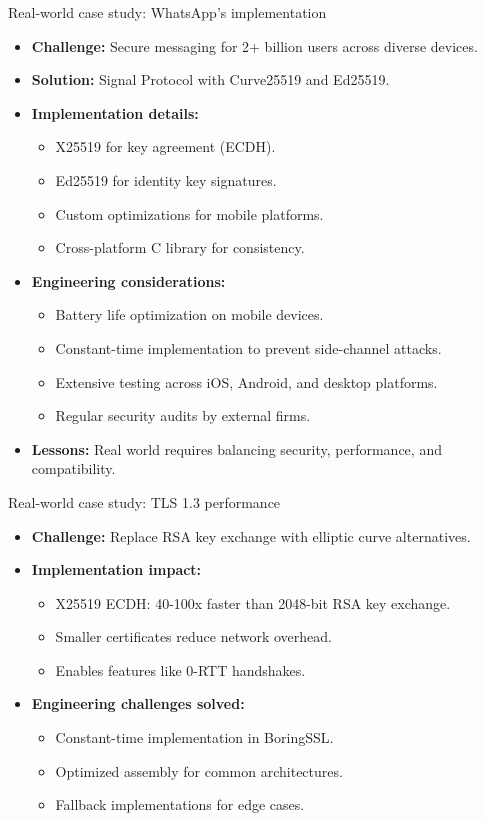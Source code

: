 \documentclass[aspectratio=169, lualatex, handout]{beamer}
\begin{document}
\begin{frame}{Real-world case study: WhatsApp's implementation}
	\begin{itemize}
		\item \textbf{Challenge:} Secure messaging for 2+ billion users across diverse devices.
		\item \textbf{Solution:} Signal Protocol with Curve25519 and Ed25519.
		\item \textbf{Implementation details:}
		      \begin{itemize}
			      \item X25519 for key agreement (ECDH).
			      \item Ed25519 for identity key signatures.
			      \item Custom optimizations for mobile platforms.
			      \item Cross-platform C library for consistency.
		      \end{itemize}
		\item \textbf{Engineering considerations:}
		      \begin{itemize}
			      \item Battery life optimization on mobile devices.
			      \item Constant-time implementation to prevent side-channel attacks.
			      \item Extensive testing across iOS, Android, and desktop platforms.
			      \item Regular security audits by external firms.
		      \end{itemize}
		\item \textbf{Lessons:} Real world requires balancing security, performance, and compatibility.
	\end{itemize}
\end{frame}

\begin{frame}{Real-world case study: TLS 1.3 performance}
	\begin{itemize}
		\item \textbf{Challenge:} Replace RSA key exchange with elliptic curve alternatives.
		\item \textbf{Implementation impact:}
		      \begin{itemize}
			      \item X25519 ECDH: 40-100x faster than 2048-bit RSA key exchange.
			      \item Smaller certificates reduce network overhead.
			      \item Enables features like 0-RTT handshakes.
		      \end{itemize}
		\item \textbf{Engineering challenges solved:}
		      \begin{itemize}
			      \item Constant-time implementation in BoringSSL.
			      \item Optimized assembly for common architectures.
			      \item Fallback implementations for edge cases.
		      \end{itemize}
	\end{itemize}
\end{frame}
\end{document}
